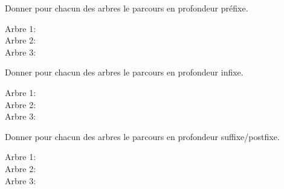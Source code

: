 \documentclass[a4paper, noanswers, addpoints, 12pt]{exam}
\begin{document}
\begin{questions}
\question[3] Donner pour chacun des arbres le parcours en profondeur préfixe.
\begin{description}
    \item[Arbre 1:]
    \item[Arbre 2:] 
    \item[Arbre 3:] 
\end{description}
\question[3] Donner pour chacun des arbres le parcours en profondeur infixe.
\begin{description}
    \item[Arbre 1:]
    \item[Arbre 2:] 
    \item[Arbre 3:] 
\end{description}
\question[3] Donner pour chacun des arbres le parcours en profondeur suffixe/postfixe.
\begin{description}
    \item[Arbre 1:]
    \item[Arbre 2:] 
    \item[Arbre 3:] 
\end{description}


\end{questions}
\end{document}
